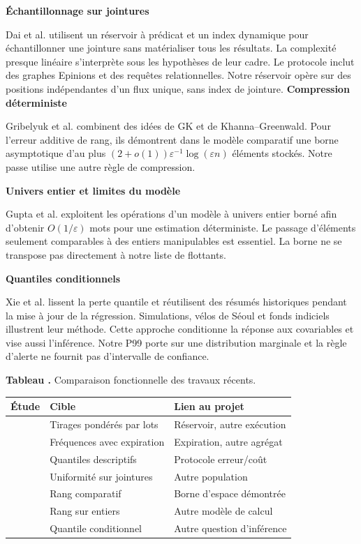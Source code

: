 \documentclass[11pt,a4paper,twocolumn]{article}
\newcommand{\topic}[1]{\textbf{\color{navy}#1}\par}
\newcommand{\tbl}[1]{\refstepcounter{table}\small\textbf{Tableau \thetable.} #1\par}
\newcommand{\columnbreak}{\newpage}
\begin{document}
\topic{Échantillonnage sur jointures}
Dai et al. \cite{dai2024} utilisent un réservoir à prédicat et un index dynamique pour échantillonner une jointure sans matérialiser tous les résultats. La complexité presque linéaire s’interprète sous les hypothèses de leur cadre. Le protocole inclut des graphes Epinions et des requêtes relationnelles. Notre réservoir opère sur des positions indépendantes d’un flux unique, sans index de jointure.
\columnbreak
\topic{Compression déterministe}
Gribelyuk et al. \cite{gribelyuk2024} combinent des idées de GK et de Khanna--Greenwald. Pour l’erreur additive de rang, ils démontrent dans le modèle comparatif une borne asymptotique d’au plus $(2+o(1))\varepsilon^{-1}\log(\varepsilon n)$ éléments stockés. Notre passe utilise une autre règle de compression.

\topic{Univers entier et limites du modèle}
Gupta et al. \cite{gupta2024} exploitent les opérations d’un modèle à univers entier borné afin d’obtenir $O(1/\varepsilon)$ mots pour une estimation déterministe. Le passage d’éléments seulement comparables à des entiers manipulables est essentiel. La borne ne se transpose pas directement à notre liste de flottants.

\topic{Quantiles conditionnels}
Xie et al. \cite{xie2025} lissent la perte quantile et réutilisent des résumés historiques pendant la mise à jour de la régression. Simulations, vélos de Séoul et fonds indiciels illustrent leur méthode. Cette approche conditionne la réponse aux covariables et vise aussi l’inférence. Notre P99 porte sur une distribution marginale et la règle d’alerte ne fournit pas d’intervalle de confiance.

\tbl{Comparaison fonctionnelle des travaux récents.}
{\footnotesize
\begin{tabularx}{\columnwidth}{@{}lXX@{}}
\toprule Étude & Cible & Lien au projet\\ \midrule
\cite{huebschle2022} & Tirages pondérés par lots & Réservoir, autre exécution\\
\cite{gou2023} & Fréquences avec expiration & Expiration, autre agrégat\\
\cite{fernando2023} & Quantiles descriptifs & Protocole erreur/coût\\
\cite{dai2024} & Uniformité sur jointures & Autre population\\
\cite{gribelyuk2024} & Rang comparatif & Borne d’espace démontrée\\
\cite{gupta2024} & Rang sur entiers & Autre modèle de calcul\\
\cite{xie2025} & Quantile conditionnel & Autre question d’inférence\\ \bottomrule
\end{tabularx}}
\end{document}
